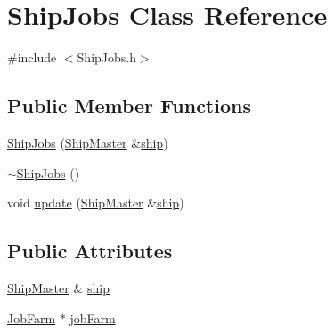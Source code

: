 \hypertarget{classShipJobs}{\section{Ship\-Jobs Class Reference}
\label{classShipJobs}
}


{\ttfamily \#include $<$Ship\-Jobs.\-h$>$}

\subsection*{Public Member Functions}
\begin{DoxyCompactItemize}
\item 
\hyperlink{classShipJobs_a3e94b6c233e66a65038c21ce63cc6f26}{Ship\-Jobs} (\hyperlink{classShipMaster}{Ship\-Master} \&\hyperlink{classShipJobs_a2112b563f2d3a78fbab5fd4e12c03fc0}{ship})
\item 
\hyperlink{classShipJobs_ac9e1fa1e5a50b89d17deddb5b870339a}{$\sim$\-Ship\-Jobs} ()
\item 
void \hyperlink{classShipJobs_a0505283b53093e81c21f0d8c7021b726}{update} (\hyperlink{classShipMaster}{Ship\-Master} \&\hyperlink{classShipJobs_a2112b563f2d3a78fbab5fd4e12c03fc0}{ship})
\end{DoxyCompactItemize}
\subsection*{Public Attributes}
\begin{DoxyCompactItemize}
\item 
\hyperlink{classShipMaster}{Ship\-Master} \& \hyperlink{classShipJobs_a2112b563f2d3a78fbab5fd4e12c03fc0}{ship}
\item 
\hyperlink{classJobFarm}{Job\-Farm} $\ast$ \hyperlink{classShipJobs_ac9319906c1485fe075283f56a635937a}{job\-Farm}
\end{DoxyCompactItemize}



